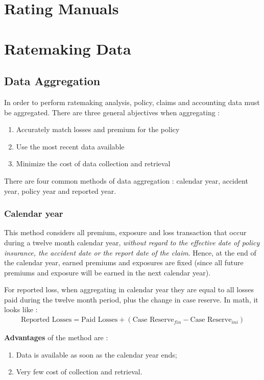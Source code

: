 \documentclass[11pt, english]{memoir}
\numberwithin{definition}{section}
\begin{document}
	
	
	
	\chapter{Rating Manuals}
	
	\chapter{Ratemaking Data}
	
	\section{Data Aggregation}
	In order to perform ratemaking analysis, policy, claims and accounting data must be aggregated. There are three general abjectives when aggregating : 
	
	\begin{enumerate}
		\item Accurately match losses and premium for the policy
		\item Use the most recent data available
		\item Minimize the cost of data collection and retrieval
	\end{enumerate}
	
	There are four common methods of data aggregation : calendar year, accident year, policy year and reported year. 
	
	\subsection{Calendar year}
	This method considers all premium, exposure and loss transaction that occur during a twelve month calendar year, \emph{without regard to the effective date of policy insurance, the accident date or the report date of the claim}. Hence, at the end of the calendar year, earned premiums and exposures are fixed (since all future premiums and exposure will be earned in the next calendar year). 
	
	For reported loss, when aggregating in calendar year they are equal to all losses paid during the twelve month period, plus the change in case reserve. In math, it looks like : 
	\begin{align*}
	\text{Reported Losses} = \text{Paid Losses} + (\text{Case Reserve}_{fin} - \text{Case Reserve}_{ini})
	\end{align*}
	
	
	\textbf{Advantages} of the method are :
	\begin{enumerate}
		\item Data is available as soon as the calendar year ends;
		\item Very few cost of collection and retrieval. 
	\end{enumerate}
	
\end{document}
